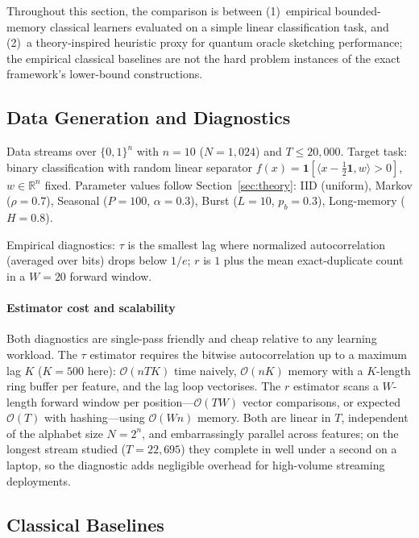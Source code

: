 \documentclass[sensors,article,submit,pdftex,moreauthors]{Definitions/mdpi}
\newcommand{\R}{\mathbb{R}}
\newcommand{\bigO}{\mathcal{O}}
\providecommand{\DIFadd}[1]{{\protect\color{blue}#1}} %
\providecommand{\DIFaddbegin}{} %
\providecommand{\DIFaddend}{} %
\begin{document}
Throughout this section, the comparison is between (1)~empirical bounded-memory classical learners evaluated on a simple linear classification task, and (2)~a theory-inspired heuristic proxy for quantum oracle sketching performance; the empirical classical baselines are not the hard problem instances of the exact framework's lower-bound constructions.

\subsection{Data Generation and Diagnostics}

Data streams over $\{0,1\}^n$ with $n = 10$ ($N = 1{,}024$) and $T \leq 20{,}000$. Target task: binary classification with random linear separator $f(x) = \mathbf{1}[\langle x - \tfrac{1}{2}\mathbf{1}, w \rangle > 0]$, $w \in \R^n$ fixed. Parameter values follow Section~\ref{sec:theory}: IID (uniform), Markov ($\rho = 0.7$), Seasonal ($P = 100$, $\alpha = 0.3$), Burst ($L = 10$, $p_b = 0.3$), Long-memory ($H = 0.8$).

Empirical diagnostics: $\tau$ is the smallest lag where normalized autocorrelation (averaged over bits) drops below $1/e$; $r$ is $1$ plus the mean exact-duplicate count in a $W = 20$ forward window.

\DIFaddbegin \paragraph{\DIFadd{Estimator cost and scalability}} \DIFadd{Both diagnostics are single-pass friendly and cheap relative to any learning workload. The $\tau$ estimator requires the bitwise autocorrelation up to a maximum lag $K$ ($K = 500$ here): $\bigO(n T K)$ time naively, $\bigO(n K)$ memory with a $K$-length ring buffer per feature, and the lag loop vectorises. The $r$ estimator scans a $W$-length forward window per position---$\bigO(T W)$ vector comparisons, or expected $\bigO(T)$ with hashing---using $\bigO(W n)$ memory. Both are linear in $T$, independent of the alphabet size $N = 2^n$, and embarrassingly parallel across features; on the longest stream studied ($T = 22{,}695$) they complete in well under a second on a laptop, so the diagnostic adds negligible overhead for high-volume streaming deployments.
}

\DIFaddend \subsection{Classical Baselines}
\end{document}
